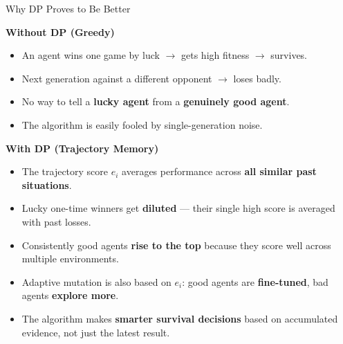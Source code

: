 \documentclass[aspectratio=169, 10pt]{beamer}
\begin{document}
\begin{frame}{Why DP Proves to Be Better}

\textbf{\textcolor{amritaMaroon}{Without DP (Greedy)}}
\begin{itemize}
    \item An agent wins one game by luck $\rightarrow$ gets high fitness $\rightarrow$ survives.
    \item Next generation against a different opponent $\rightarrow$ loses badly.
    \item No way to tell a \textbf{lucky agent} from a \textbf{genuinely good agent}.
    \item The algorithm is easily fooled by single-generation noise.
\end{itemize}

\vspace{0.4cm}
\textbf{\textcolor{amritaMaroon}{With DP (Trajectory Memory)}}
\begin{itemize}
    \item The trajectory score $e_i$ averages performance across \textbf{all similar past situations}.
    \item Lucky one-time winners get \textbf{diluted} --- their single high score is averaged with past losses.
    \item Consistently good agents \textbf{rise to the top} because they score well across multiple environments.
    \item Adaptive mutation is also based on $e_i$: good agents are \textbf{fine-tuned}, bad agents \textbf{explore more}.
    \item The algorithm makes \textbf{smarter survival decisions} based on accumulated evidence, not just the latest result.
\end{itemize}

\end{frame}
\end{document}
